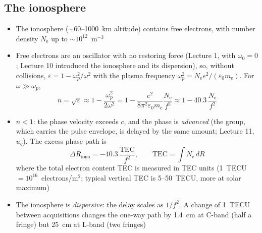 \documentclass[11pt, oneside]{article}
\newcommand{\TEC}{\mathrm{TEC}}
\begin{document}
\subsection{The ionosphere}

\begin{itemize}
	\item The ionosphere ($\sim$60--1000~km altitude) contains free electrons, with number density $N_\mathrm{e}$ up to $\sim$$10^{12}$~m$^{-3}$
	\item Free electrons are an oscillator with no restoring force (Lecture 1, with $\omega_0 = 0$; Lecture 10 introduced the ionosphere and its dispersion), so, without collisions, $\varepsilon = 1 - \omega_p^2/\omega^2$ with the plasma frequency $\omega_p^2 = N_\mathrm{e}e^2/(\varepsilon_0m_\mathrm{e})$. For $\omega \gg \omega_p$,
	\begin{equation}
		\label{e:niono}
		n = \sqrt{\varepsilon} \approx 1 - \frac{\omega_p^2}{2\omega^2} = 1 - \frac{e^2}{8\pi^2\varepsilon_0m_\mathrm{e}}\frac{N_\mathrm{e}}{f^2} \approx 1 - 40.3\,\frac{N_\mathrm{e}}{f^2}
	\end{equation}
	\item $n < 1$: the phase velocity exceeds $c$, and the phase is \emph{advanced} (the group, which carries the pulse envelope, is delayed by the same amount; Lecture 11, $u_g$). The excess phase path is
	\begin{equation}
		\label{e:diono}
		\Delta R_\mathrm{iono} = -40.3\,\frac{\TEC}{f^2}, \qquad \TEC = \int N_\mathrm{e}\,dR
	\end{equation}
	where the total electron content TEC is measured in TEC units (1~TECU $= 10^{16}$~electrons/m$^2$; typical vertical TEC is 5--50~TECU, more at solar maximum)
	\item[$\bigstar$] The ionosphere is \emph{dispersive}: the delay scales as $1/f^2$. A change of 1~TECU between acquisitions changes the one-way path by 1.4~cm at C-band (half a fringe) but 25~cm at L-band (two fringes)
	\begin{itemize}

\end{itemize}$$
\end{itemize}
\end{document}
